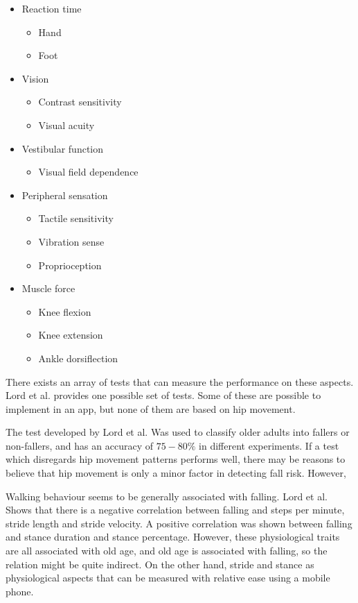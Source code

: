 \begin{itemize}
\item Reaction time
\begin{itemize}
\item Hand
\item Foot
\end{itemize}
\item Vision
\begin{itemize}
\item Contrast sensitivity
\item Visual acuity
\end{itemize}
\item Vestibular function
\begin{itemize}
\item Visual field dependence
\end{itemize}
\item 
Peripheral sensation
\begin{itemize}
\item Tactile sensitivity
\item Vibration sense
\item Proprioception
\end{itemize}
\item Muscle force
\begin{itemize}
\item Knee flexion
\item Knee extension
\item Ankle dorsiflection
\end{itemize}
\end{itemize}


There exists an array of tests that can measure the performance on these aspects. Lord et al. provides one possible set of tests. Some of these are possible to implement in an app, but none of them are based on hip movement.

The test developed by Lord et al. Was used to classify older adults into fallers or non-fallers, and has an accuracy of $75-80\%$ in different experiments.\cite{LMTassessPrev} If a test which disregards hip movement patterns performs well, there may be reasons to believe that hip movement is only a minor factor in detecting fall risk. However, 

Walking behaviour seems to be generally associated with falling. Lord et al. Shows that there is a negative correlation between falling and steps per minute, stride length and stride velocity. A positive correlation was shown between falling and stance duration and stance percentage. However, these physiological traits are all associated with old age, and old age is associated with falling, so the relation might be quite indirect. On the other hand, stride and stance as physiological aspects that can be measured with relative ease using a mobile phone.\cite{LLKgaitPatterns}